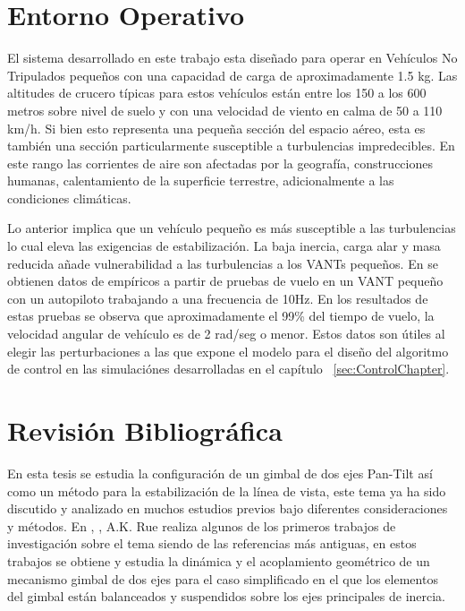 \section{Entorno Operativo}

El sistema desarrollado en este trabajo esta dise\~{n}ado para operar en Veh\'{i}culos No Tripulados peque\~{n}os con una capacidad de carga de aproximadamente 1.5 kg. Las altitudes de crucero t\'{i}picas para estos veh\'{i}culos est\'{a}n entre los 150 a los 600 metros sobre nivel de suelo y con una velocidad de viento en calma de 50 a 110 km/h. Si bien esto representa una peque\~{n}a secci\'{o}n del espacio a\'{e}reo, esta es tambi\'{e}n una secci\'{o}n particularmente susceptible a turbulencias impredecibles. En este rango las corrientes de aire son afectadas por la geograf\'{i}a, construcciones humanas, calentamiento de la superficie terrestre, adicionalmente a las condiciones clim\'{a}ticas. 

Lo anterior implica que un veh\'{i}culo peque\~{n}o es m\'{a}s susceptible a las turbulencias lo cual eleva las exigencias de estabilizaci\'{o}n. La baja inercia, carga alar y masa reducida a\~{n}ade vulnerabilidad a las turbulencias a los VANTs peque\~{n}os. En \cite{26} se obtienen datos de emp\'{i}ricos a partir de pruebas de vuelo en un VANT peque\~{n}o con un autopiloto trabajando a una frecuencia de 10Hz. En los resultados de estas pruebas se observa que aproximadamente el 99\% del tiempo de vuelo, la velocidad angular de veh\'{i}culo es de 2 rad/seg o menor. Estos datos son \'{u}tiles al elegir las perturbaciones a las que expone el modelo para el dise\~{n}o del algoritmo de control en las simulaci\'{o}nes desarrolladas en el cap\'{i}tulo ~\ref{sec:ControlChapter}. 

\section{Revisi\'{o}n Bibliogr\'{a}fica} 

En esta tesis se estudia la configuraci\'{o}n de un gimbal de dos ejes Pan-Tilt as\'{i} como un m\'{e}todo para la estabilizaci\'{o}n de la l\'{i}nea de vista, este tema ya ha sido discutido y analizado en muchos estudios previos bajo diferentes consideraciones y m\'{e}todos. En \cite{8}, \cite{9}, A.K. Rue realiza algunos de los primeros trabajos de investigaci\'{o}n sobre el tema siendo de las referencias m\'{a}s antiguas, en estos trabajos se obtiene y estudia la din\'{a}mica y el acoplamiento geom\'{e}trico de un mecanismo gimbal de dos ejes para el caso simplificado en el que los elementos del gimbal est\'{a}n balanceados y suspendidos sobre los ejes principales de inercia.  


